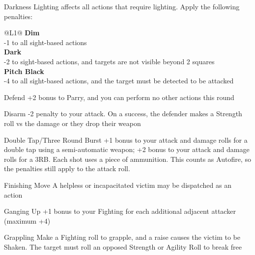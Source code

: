 \begin{genericsection}{Darkness}
Lighting affects all actions that require lighting. Apply the following penalties:
\begin{redtable}{\linewidth}{@{}L{1}@{}}
  \textbf{Dim} \\
  -1 to all sight-based actions\\
  \textbf{Dark} \\
  -2 to sight-based actions, and targets are not visible beyond 2 squares\\
  \textbf{Pitch Black} \\
  -4 to all sight-based actions, and the target must be detected to be attacked\\
\end{redtable}
\end{genericsection}

\begin{genericsection}{Defend}
+2 bonus to Parry, and you can perform no other actions this round
\end{genericsection}

\begin{genericsection}{Disarm}
-2 penalty to your attack. On a success, the defender makes a Strength roll vs the damage or they drop their weapon
\end{genericsection}

\begin{genericsection}{Double Tap/Three Round Burst}
+1 bonus to your attack and damage rolls for a double tap using a semi-automatic weapon; +2 bonus to your attack and damage rolls for a 3RB. Each shot uses a piece of ammunition. This counts as Autofire, so the penalties still apply to the attack roll.
\end{genericsection}

\begin{genericsection}{Finishing Move}
A helpless or incapacitated victim may be dispatched as an action
\end{genericsection}

\begin{genericsection}{Ganging Up}
+1 bonus to your Fighting for each additional adjacent attacker (maximum +4)
\end{genericsection}

\begin{genericsection}{Grappling}
Make a Fighting roll to grapple, and a raise causes the victim to be Shaken. The target must roll an opposed Strength or Agility Roll to break free
\end{genericsection}

